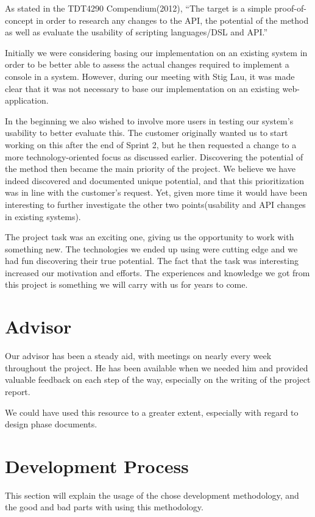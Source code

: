 As stated in the TDT4290 Compendium(2012), 
“The target is a simple proof-of-concept in order to research any changes to the API, the potential of the method as well as evaluate the usability of scripting languages/DSL and API.”

Initially we were considering basing our implementation on an existing system in order to be better able to assess the actual changes required to implement a console in a system. However, during our meeting with Stig Lau, it was made clear that it was not necessary to base our implementation on an existing web-application. 

In the beginning we also wished to involve more users in testing our system’s usability to better evaluate this. The customer originally wanted us to start working on this after the end of Sprint 2, but he then requested a change to a more technology-oriented focus as discussed earlier. Discovering the potential of the method then became the main priority of the project. We believe we have indeed discovered and documented unique potential, and that this prioritization was in line with the customer’s request. Yet, given more time it would have been interesting to further investigate the other two points(usability and API changes in existing systems).


The project task was an exciting one, giving us the opportunity to work with something new. The technologies we ended up using were cutting edge and we had fun discovering their true potential. The fact that the task was interesting increased our motivation and efforts. The experiences and knowledge we got from this project is something we will carry with us for years to come.

\section{Advisor}
Our advisor has been a steady aid, with meetings on nearly every week throughout the project. He has been available when we needed him and provided valuable feedback on each step of the way, especially on the writing of the project report.

We could have used this resource to a greater extent, especially with regard to design phase documents.

\section{Development Process}
This section will explain the usage of the chose development methodology, and the good and bad parts with using this methodology.

